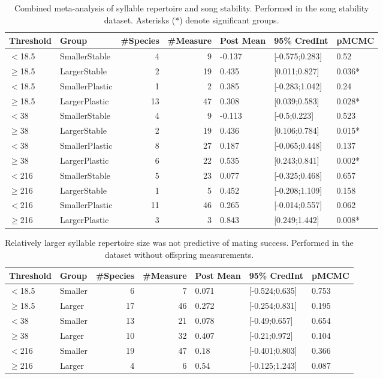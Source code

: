 \documentclass{article}
\begin{document}
  \begin{table}[H]
  \centering
  \caption{Combined meta-analysis of syllable repertoire and song stability.  Performed in the song stability dataset.  Asterisks (*) denote significant groups.} 
  \begin{tabular}{llrrlll}
  \hline
  Threshold & Group & \#Species & \#Measure & Post Mean & 95\% CredInt & pMCMC \\ 
  \hline
  $<$18.5 & SmallerStable &   4 & 9 & -0.137 & [-0.575;0.283] & 0.52 \\ 
  $\ge$18.5 & LargerStable &   2 & 19 & 0.435 & [0.011;0.827] & 0.036* \\ 
  $<$18.5 & SmallerPlastic &   1 & 2 & 0.385 & [-0.283;1.042] & 0.24 \\ 
  $\ge$18.5 & LargerPlastic &  13 & 47 & 0.308 & [0.039;0.583] & 0.028* \\ 
  $<$38 & SmallerStable &   4 & 9 & -0.113 & [-0.5;0.223] & 0.523 \\ 
  $\ge$38 & LargerStable &   2 & 19 & 0.436 & [0.106;0.784] & 0.015* \\ 
  $<$38 & SmallerPlastic &   8 & 27 & 0.187 & [-0.065;0.448] & 0.137 \\ 
  $\ge$38 & LargerPlastic &   6 & 22 & 0.535 & [0.243;0.841] & 0.002* \\ 
  $<$216 & SmallerStable &   5 & 23 & 0.077 & [-0.325;0.468] & 0.657 \\ 
  $\ge$216 & LargerStable &   1 & 5 & 0.452 & [-0.208;1.109] & 0.158 \\ 
  $<$216 & SmallerPlastic &  11 & 46 & 0.265 & [-0.014;0.557] & 0.062 \\ 
  $\ge$216 & LargerPlastic &   3 & 3 & 0.843 & [0.249;1.442] & 0.008* \\ 
  \hline
  \end{tabular}
  \end{table}
  
  
  \begin{table}[H]
  \centering
  \caption{Relatively larger syllable repertoire size was not predictive of mating success.  Performed in the dataset without offspring measurements.} 
  \begin{tabular}{llrrlll}
  \hline
  Threshold & Group & \#Species & \#Measure & Post Mean & 95\% CredInt & pMCMC \\ 
  \hline
  $<$18.5 & Smaller &   6 & 7 & 0.071 & [-0.524;0.635] & 0.753 \\ 
  $\ge$18.5 & Larger &  17 & 46 & 0.272 & [-0.254;0.831] & 0.195 \\ 
  $<$38 & Smaller &  13 & 21 & 0.078 & [-0.49;0.657] & 0.654 \\ 
  $\ge$38 & Larger &  10 & 32 & 0.407 & [-0.21;0.972] & 0.104 \\ 
  $<$216 & Smaller &  19 & 47 & 0.18 & [-0.401;0.803] & 0.366 \\ 
  $\ge$216 & Larger &   4 & 6 & 0.54 & [-0.125;1.243] & 0.087 \\ 
  \hline
  \end{tabular}
  \end{table}
  
\end{document}
